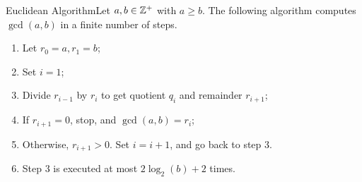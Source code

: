 



\begin{theorem}
    {Euclidean Algorithm}Let $a,b \in \mathbb{Z}^+$ with $a \geq b$. The following algorithm computes $\gcd(a,b)$ in a finite number of steps. \begin{enumerate}
        \item Let $r_0 = a, r_1 = b$;
        \item Set $i = 1$;
        \item Divide $r_{i - 1}$ by $r_i$ to get quotient $q_i$ and remainder $r_{i + 1}$;
        \item If $r_{i + 1} = 0$, stop, and $\gcd(a,b) = r_i$;
        \item Otherwise, $r_{i + 1} > 0$. Set $i = i + 1$, and go back to step 3.
        \item Step 3 is executed at most $2\log_2(b) + 2$ times.
    \end{enumerate}
\end{theorem}

